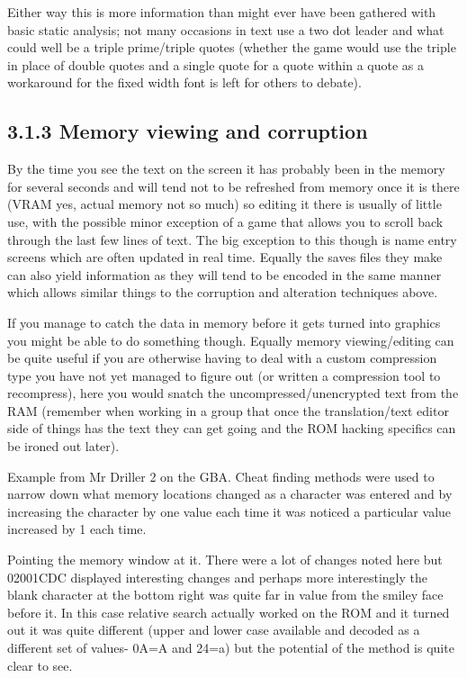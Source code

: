 \documentclass[
]{book}
\begin{document}
Either way this is more information than might ever have been gathered with basic static analysis; not many occasions in text use a two dot leader and what could well be a triple prime/triple quotes (whether the game would use the triple in place of double quotes and a single quote for a quote within a quote as a workaround for the fixed width font is left for others to debate).

\hypertarget{memory-viewing-and-corruption}{%
\subsection{3.1.3 Memory viewing and corruption}\label{memory-viewing-and-corruption}}

By the time you see the text on the screen it has probably been in the memory for several seconds and will tend not to be refreshed from memory once it is there (VRAM yes, actual memory not so much) so editing it there is usually of little use, with the possible minor exception of a game that allows you to scroll back through the last few lines of text. The big exception to this though is name entry screens which are often updated in real time. Equally the saves files they make can also yield information as they will tend to be encoded in the same manner which allows similar things to the corruption and alteration techniques above.

If you manage to catch the data in memory before it gets turned into graphics you might be able to do something though. Equally memory viewing/editing can be quite useful if you are otherwise having to deal with a custom compression type you have not yet managed to figure out (or written a compression tool to recompress), here you would snatch the uncompressed/unencrypted text from the RAM (remember when working in a group that once the translation/text editor side of things has the text they can get going and the ROM hacking specifics can be ironed out later).

Example from Mr Driller 2 on the GBA. Cheat finding methods were used to narrow down what memory locations changed as a character was entered and by increasing the character by one value each time it was noticed a particular value increased by 1 each time.

Pointing the memory window at it. There were a lot of changes noted here but 02001CDC displayed interesting changes and perhaps more interestingly the blank character at the bottom right was quite far in value from the smiley face before it. In this case relative search actually worked on the ROM and it turned out it was quite different (upper and lower case available and decoded as a different set of values- 0A=A and 24=a) but the potential of the method is quite clear to see.
\end{document}
